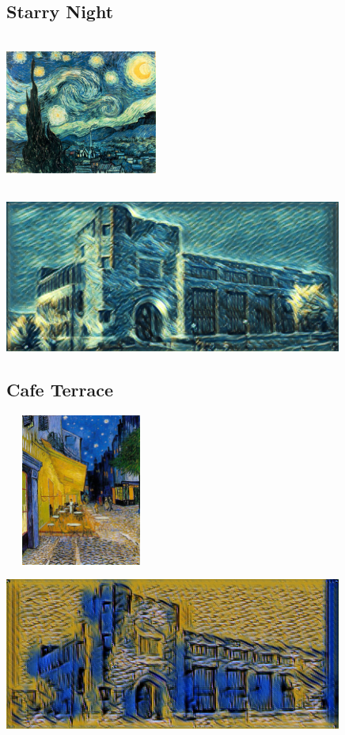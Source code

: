 \documentclass[12pt]{article}
\begin{document}
\subsection{Starry Night}
\begin{minipage}[c]{0.3\textwidth}
\includegraphics[height=50mm, width=50mm]{visuals/styles/starry-night.jpg}
\end{minipage}
\begin{minipage}[c]{0.6\textwidth}
\includegraphics[height=50mm]{visuals/results/06.png}
\end{minipage}

\subsection{Cafe Terrace}
\begin{minipage}[c]{0.3\textwidth}
\includegraphics[height=50mm, width=50mm]{visuals/styles/cafe-terrace-at-night.jpg}
\end{minipage}
\begin{minipage}[c]{0.6\textwidth}
\includegraphics[height=50mm]{visuals/results/07.png}
\end{minipage}
\end{document}
